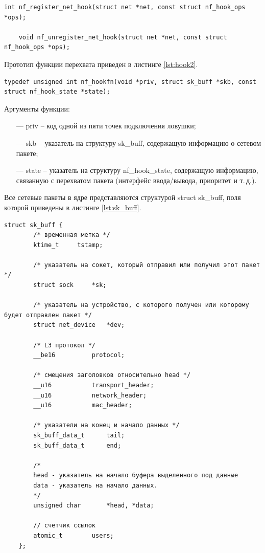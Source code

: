 \documentclass{bmstu}
\begin{document}
\begin{lstlisting}[caption = {Функции для регистрации и удаления функций перехвата}, label=lst:hook_reg]
	int nf_register_net_hook(struct net *net, const struct nf_hook_ops *ops);

	void nf_unregister_net_hook(struct net *net, const struct nf_hook_ops *ops);
\end{lstlisting}

Прототип функции перехвата приведен в листинге \ref{lst:hook2}.

\begin{lstlisting}[caption = {Прототип функции-ловушки}, label=lst:hook2]
typedef unsigned int nf_hookfn(void *priv, struct sk_buff *skb, const struct nf_hook_state *state);
\end{lstlisting}

Аргументы функции:
\begin{itemize}
	\item[---] priv -- код одной из пяти точек подключения ловушки;
	\item[---] skb -- указатель на структуру sk\_buff, содержащую информацию о сетевом пакете; 
	\item[---] state -- указатель на структуру nf\_hook\_state, содержащую информацию, связанную с перехватом пакета (интерфейс ввода/вывода, приоритет и т.\,д.).
\end{itemize}

Все сетевые пакеты в ядре представляются структурой struct sk\_buff, поля которой приведены в листинге \ref{lst:sk_buff}.


\begin{lstlisting}[caption = {Структура struct sk\_buff}, label=lst:sk_buff]
	struct sk_buff {
		/* временная метка */
		ktime_t     tstamp;
		
		/* указатель на сокет, который отправил или получил этот пакет */
		struct sock     *sk;
		
		/* указатель на устройство, с которого получен или которому будет отправлен пакет */
		struct net_device   *dev;
		
		/* L3 протокол */
		__be16          protocol;
		
		/* смещения заголовков относительно head */
		__u16           transport_header;
		__u16           network_header;
		__u16           mac_header;
		
		/* указатели на конец и начало данных */
		sk_buff_data_t      tail;
		sk_buff_data_t      end;
		
		/* 
		head - указатель на начало буфера выделенного под данные
		data - указатель на начало данных. 
		*/
		unsigned char       *head, *data;
		
		// счетчик ссылок 
		atomic_t        users;
	};
\end{lstlisting}
\end{document}
